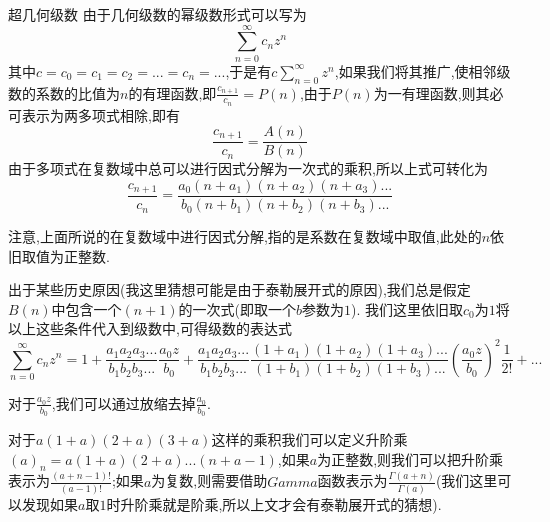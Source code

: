 \documentclass[zihao=-4,a4paper]{ctexart}
\begin{document}
\begin{mdefinition}{超几何级数}
	由于几何级数的幂级数形式可以写为
	\begin{equation*}
		\sum^{\infty}_{n=0} {c}_{n} {z}^{n}
	\end{equation*}
	其中$ {c} = {c}_{0} = {c}_{1} = {c}_{2} = ... = {c}_{n} = ... $,于是有${c} \sum^{\infty}_{n=0} {z}^{n} $,如果我们将其推广,使相邻级数的系数的比值为$ {n} $的有理函数,即$ \frac{ {c}_{n+1} }{ {c}_{n} } = {P} \left( {n} \right)$,由于$ {P} \left( {n} \right) $为一有理函数,则其必可表示为两多项式相除,即有
	\begin{equation*}
		\frac{ {c}_{n+1} }{ {c}_{n} } = \frac{ {A} \left( {n} \right) }{ {B} \left( {n} \right) }
	\end{equation*}
	由于多项式在复数域中总可以进行因式分解为一次式的乘积,所以上式可转化为
	\begin{equation*}
		\frac{ {c}_{n+1} }{ {c}_{n} } = \frac{ {a}_{0} \left( {n} + {a}_{1} \right) \left( {n} + {a}_{2} \right) \left( {n} + {a}_{3} \right) ... }{  {b}_{0} \left( {n} + {b}_{1} \right) \left( {n} + {b}_{2} \right) \left( {n} + {b}_{3} \right) ... }
	\end{equation*}

	注意,上面所说的在复数域中进行因式分解,指的是系数在复数域中取值,此处的$ {n} $依旧取值为正整数.

	出于某些历史原因(我这里猜想可能是由于泰勒展开式的原因),我们总是假定$ {B} \left( {n} \right) $中包含一个$ \left( {n} + 1 \right) $的一次式(即取一个$ {b} $参数为$ 1 $).
	我们这里依旧取$ {c}_{0} $为$1$将以上这些条件代入到级数中,可得级数的表达式
	\begin{equation}
		\sum^{\infty}_{n=0} {c}_{n} {z}^{n} = 1 + \frac{ {a}_{1} {a}_{2} {a}_{3} ... }{ {b}_{1} {b}_{2} {b}_{3} ... } \frac{ {a}_{0} {z} }{ {b}_{0} } + \frac{ {a}_{1} {a}_{2} {a}_{3} ... }{ {b}_{1} {b}_{2} {b}_{3} ... } \frac{ \left( {1} + {a}_{1} \right) \left( {1} + {a}_{2} \right) \left( {1} + {a}_{3} \right) ... }{ \left( {1} + {b}_{1} \right) \left( {1} + {b}_{2} \right) \left( {1} + {b}_{3} \right) ... } \left( \frac{ {a}_{0} z }{ {b}_{0} } \right)^{2} \frac{ {1} }{ {2} ! } + ...
	\end{equation}

	对于$\frac{ {a}_{0} {z} }{ {b}_{0} }$,我们可以通过放缩去掉$\frac{ {a}_{0} }{ {b}_{0} }$.

	对于$ {a} \left( {1} + {a} \right) \left( {2} + {a} \right) \left( {3} + {a} \right) $这样的乘积我们可以定义升阶乘$ { \left( {a} \right) }_{n} = {a} \left( {1} + {a} \right) \left( {2} + {a} \right) ... \left( {n} + {a} - {1} \right) $,如果$ {a} $为正整数,则我们可以把升阶乘表示为$ \frac{ { \left( {a} + {n} - {1} \right) } ! }{ { \left( {a} - {1} \right) } ! } $;如果$ {a} $为复数,则需要借助$Gamma$函数表示为$ \frac{ {\Gamma} { \left( {a} + {n} \right) } }{ {\Gamma} { { \left( {a} \right) } } } $(我们这里可以发现如果$ {a} $取$ 1 $时升阶乘就是阶乘,所以上文才会有泰勒展开式的猜想).


\end{mdefinition}
\end{document}
